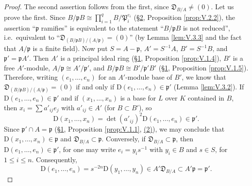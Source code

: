 \begin{proof}
The second assertion follows from the first, since
$\mathfrak{D}_{B/A}\neq(0)$. Let us prove the first. Since
$B/\mathfrak{p}B\cong\prod_{i=1}^{q}B/\mathfrak{P}_{i}^{e_{i}}$
(\hyperref[sec:5.2]{§2}, Proposition \ref{prop:V.2.2}), the assertion ``$\mathfrak{p}$
ramifies'' is equivalent to the statement ``$B/\mathfrak{p}B$ is not
reduced'', i.e.\ equivalent to
``$\mathfrak{D}_{(B/\mathfrak{p}B)/(A/\mathfrak{p})}=(0)$'' (by Lemma
\ref{lem:V.3.3} and the fact that $A/\mathfrak{p}$ is a finite field). Now
put $S=A-\mathfrak{p}$, $A'=S^{-1}A$, $B'=S^{-1}B$, and
$\mathfrak{p}'=\mathfrak{p}A'$. Then $A'$ is a principal ideal ring (\hyperref[sec:5.1]{§1},
Proposition \ref{prop:V.1.4}), $B'$ is a free $A'$-module,
$A/\mathfrak{p}\cong A'/\mathfrak{p}'$, and
$B/\mathfrak{p}B\cong B'/\mathfrak{p}'B'$ (\hyperref[sec:5.1]{§1}, Proposition
\ref{prop:V.1.5}). Therefore, writing $(e_{1},\ldots,e_{n})$ for an
$A'$-module base of $B'$, we know that
$\mathfrak{D}_{(B/\mathfrak{p}B)/(A/\mathfrak{p})}=(0)$ if and only if
$\mathrm{D}(e_{1},\ldots,e_{n})\in\mathfrak{p}'$ (Lemma \ref{lem:V.3.2}).
If $\mathrm{D}(e_{1},\ldots,e_{n})\in\mathfrak{p}'$ and if
$(x_{1},\ldots,x_{n})$ is a base for $L$ over $K$ contained in $B$, then
$x_{i}=\sum a'_{ij}e_{j}$ with $a'_{ij}\in A'$ (for $B\subset B'$), so
\[
\mathrm{D}(x_{1},\ldots,x_{n})
=\det(a'_{ij})^{2}\mathrm{D}(e_{1},\ldots,e_{n})\in\mathfrak{p}'.
\]
Since $\mathfrak{p}'\cap A=\mathfrak{p}$ (\hyperref[sec:5.1]{§1}, Proposition
\ref{prop:V.1.1}, \hyperref[prop:V.1.1.2]{(2)}), we may conclude that
$\mathrm{D}(x_{1},\ldots,x_{n})\in\mathfrak{p}$ and
$\mathfrak{D}_{B/A}\subset\mathfrak{p}$. Conversely, if
$\mathfrak{D}_{B/A}\subset\mathfrak{p}$, then
$\mathrm{D}(e_{1},\ldots,e_{n})\in\mathfrak{p}'$, for one may write
$e_{i}=y_{i}s^{-1}$ with $y_{i}\in B$ and $s\in S$, for $1\leq i\leq n$.
Consequently,
\[
\mathrm{D}(e_{1},\ldots,e_{n})=s^{-2n}\mathrm{D}(y_{1},\ldots,y_{n})
\in A'\mathfrak{D}_{B/A}\subset A'\mathfrak{p}=\mathfrak{p}'.
\]
\end{proof}

